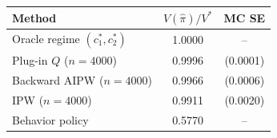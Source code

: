 \begin{tabular}{lcc}
\toprule
Method & $V(\hat\pi) / V^*$ & MC SE \\
\midrule
Oracle regime $(c_1^*, c_2^*)$ & 1.0000 & -- \\
Plug-in $Q$ ($n=4000$) & 0.9996 & (0.0001) \\
Backward AIPW ($n=4000$) & 0.9966 & (0.0006) \\
IPW ($n=4000$) & 0.9911 & (0.0020) \\
Behavior policy & 0.5770 & -- \\
\bottomrule
\end{tabular}
